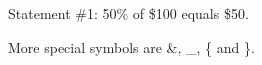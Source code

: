 \documentclass{article}
\begin{document}
Statement \#1:
50\% of \$100 equals \$50.

More special symbols are \&, \_, \{ and \}.
\end{document}
